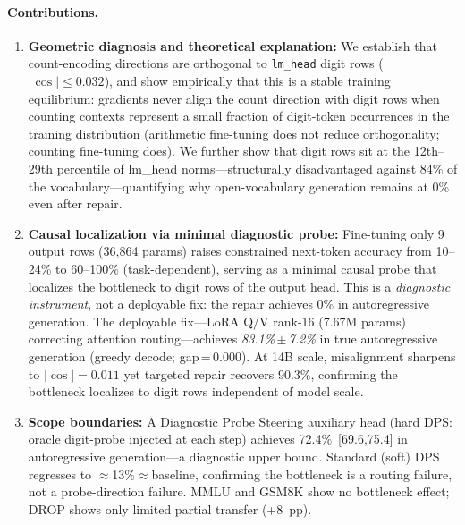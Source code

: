 \documentclass{article}
\begin{document}
\paragraph{Contributions.}
\begin{enumerate}
  \item \textbf{Geometric diagnosis and theoretical explanation:} We establish that count-encoding directions are orthogonal to \texttt{lm\_head} digit rows ($|\cos| \leq 0.032$), and show empirically that this is a stable training equilibrium: gradients never align the count direction with digit rows when counting contexts represent a small fraction of digit-token occurrences in the training distribution (arithmetic fine-tuning does not reduce orthogonality; counting fine-tuning does). We further show that digit rows sit at the 12th--29th percentile of lm\_head norms---structurally disadvantaged against 84\% of the vocabulary---quantifying why open-vocabulary generation remains at 0\% even after repair.
  \item \textbf{Causal localization via minimal diagnostic probe:} Fine-tuning only 9 output rows (36{,}864 params) raises constrained next-token accuracy from 10--24\% to 60--100\% (task-dependent), serving as a minimal causal probe that localizes the bottleneck to digit rows of the output head. This is a \emph{diagnostic instrument}, not a deployable fix: the repair achieves 0\% in autoregressive generation. The deployable fix---LoRA Q/V rank-16 (7.67M params) correcting attention routing---achieves \emph{83.1\%\,$\pm$\,7.2\%} in true autoregressive generation (greedy decode; gap\,=\,0.000). At 14B scale, misalignment sharpens to $|\cos|{=}0.011$ yet targeted repair recovers 90.3\%, confirming the bottleneck localizes to digit rows independent of model scale.
  \item \textbf{Scope boundaries:} A Diagnostic Probe Steering auxiliary head (hard DPS: oracle digit-probe injected at each step) achieves 72.4\%~[69.6,75.4] in autoregressive generation---a diagnostic upper bound. Standard (soft) DPS regresses to $\approx$13\%$\approx$baseline, confirming the bottleneck is a routing failure, not a probe-direction failure. MMLU and GSM8K show no bottleneck effect; DROP shows only limited partial transfer (+8~pp).
\end{enumerate}
\end{document}
